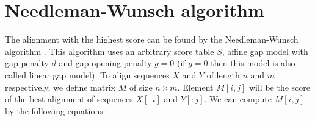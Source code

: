 \begin{comment}
Intuition behind this scoring system is probabilistic. Assume that we have
alignment of $X$ and $Y$ without gaps and that each base in DNA evolves
independently. Therefore for every pair of residues $a,b$ there is probability
that $a$ will evolve into $b$. We denote this probability as $p(a,b)$. Therefore the probability that $X$ will evolve
into $Y$ is product of probabilities that $X_i$ will evolve into $Y_i$
\[
\prob{X\text{ evolved into }Y} = \prod_{i=0}^{|X|-1}p(X_i,Y_i)
\]
If $X$ and $Y$ were generated independently be some random model $R$, then probability that we see $X_i$
and $Y_i$ is $\prob{X_i\mid R}\prob{Y_i\mid R}$ ($R$ usually samples symbols
of sequence independently from some distribution). The probability that we $X$
and $Y$ under model $R$ is
\[
\prob{X,Y\mid R} = \prod_{i=0}^{|X|-1}\prob{X_i\mid R}\prob{Y_i\mid R}
\]
As a measure of  $X$ and $Y$ being homologous we take the ratio of the
probability that $X$ evolved into $Y$ and the probability that $X$ and $Y$ are
independent.
By taking logarithm of this ratio we have
\[
\log\left(
\frac{\prob{X\text{ evolved into }Y}}{\prob{X,Y\mid R} }\right)
= \sum_{i=0}^{|X|-1}\log\left(\frac{p(X_i,Y_i)}{\prob{X_i\mid R}\prob{Y_i\mid
R}}
\right)
\]
Therefore by setting $S[a,b]=\frac{p(a,b)}{\prob{a\mid R}\prob{b\mid R}}$ we have one
possible scoring model. $S[a,b]$ is positive if is more likely that $a$ evolved
into $b$ and negative if it is more likely that $a$ and $b$ were generated
independently.  Values of $S$ are usually probabilities multiplied by some
constant and rounded to integers to avoid use of floating point numbers. 

There are two ways of deriving substitution matrices. One way is to derive them
from alignments that were constructed manually by biologists. Such matrices are
for example PAM or BLOSUM matrices. Other possible solution is to use a
theoretical model of evolution, for example Jukes-Cantor model. More details can
be found in \cite{Durbin1998}.
\end{comment}


\section{Needleman-Wunsch algorithm}
\label{SECTION:NEEDLE}


The
alignment with the highest score can be found by the Needleman-Wunsch algorithm \cite{Durbin1998}.
This algorithm uses an arbitrary score table $S$, affine gap model with gap penalty
$d$ and gap opening penalty $g=0$ (if $g=0$ then this model is also called
linear gap model). To align sequences $X$ and $Y$ of length $n$ and $m$
respectively, we define matrix $M$ of size $n\times m$. Element $M[i,j]$ will be the
score of the best alignment of sequences $X[:i]$ and $Y[:j]$. We can compute
$M[i,j]$ by the following equations:

